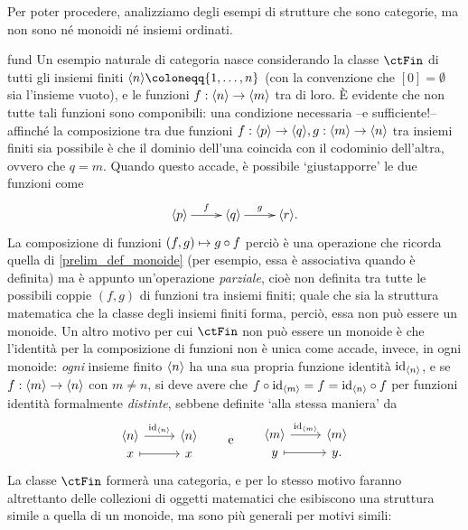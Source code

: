 Per poter procedere, analizziamo degli esempi di strutture che sono categorie, ma non sono né monoidi né insiemi ordinati.
\begin{hExample}{fund}\label{protoex_finset}
	Un esempio naturale di categoria nasce considerando la classe \(\ctFin\) di tutti gli insiemi finiti \(\bkt{n}\defeq \{\iter n\}\) (con la convenzione che \([0]=\emptyset\) sia l'insieme vuoto), e le funzioni \(f : \langle n\rangle \to \langle m\rangle\) tra di loro. \`E evidente che non tutte tali funzioni sono componibili: una condizione necessaria --e sufficiente!-- affinché la composizione tra due funzioni \(f : \langle p\rangle \to \langle q\rangle,g : \langle m\rangle \to \langle n\rangle\) tra insiemi finiti sia possibile è che il dominio dell'una coincida con il codominio dell'altra, ovvero che \(q=m\). Quando questo accade, è possibile `giustapporre' le due funzioni come
	\[\xymatrix{
			\bkt{p} \ar[r]^-f & \bkt{q} \ar[r]^-g & \bkt{r}.
		}\]
	La composizione di funzioni \((f,g)\mapsto g\circ f\) perciò è una operazione che ricorda quella di \ref{prelim_def_monoide} (per esempio, essa è associativa quando è definita) ma è appunto un'operazione \emph{parziale}, cioè non definita tra tutte le possibili coppie \((f,g)\) di funzioni tra insiemi finiti; quale che sia la struttura matematica che la classe degli insiemi finiti forma, perciò, essa non può essere un monoide. Un altro motivo per cui \(\ctFin\) non può essere un monoide è che l'identità per la composizione di funzioni non è unica come accade, invece, in ogni monoide: \emph{ogni} insieme finito \(\langle n\rangle\) ha una sua propria funzione identità \(\mathrm{id}_{\langle n\rangle}\), e se \(f : \langle m\rangle\to \langle n\rangle\) con \(m\ne n\), si deve avere che \(f\circ \mathrm{id}_{\langle m\rangle}=f=\mathrm{id}_{\langle n\rangle}\circ f\) per funzioni identità formalmente \emph{distinte}, sebbene definite `alla stessa maniera' da
	\[
		\begin{tikzcd}[row sep=0]
			{\bkt{n}} \ar{r}{\id_{\bkt{n}}} & {\bkt{n}} \\
			x \ar[mapsto]{r} & x
		\end{tikzcd}
		\qquad\mbox{e}\qquad
		\begin{tikzcd}[row sep=0]
			{\bkt{m}} \ar{r}{\id_{\bkt{m}}} & {\bkt{m}} \\
			y \ar[mapsto]{r} & y .
		\end{tikzcd}
	\]
	La classe \(\ctFin\) formerà una categoria, e per lo stesso motivo faranno altrettanto delle collezioni di oggetti matematici che esibiscono una struttura simile a quella di un monoide, ma sono più generali per motivi simili:

\end{hExample}

